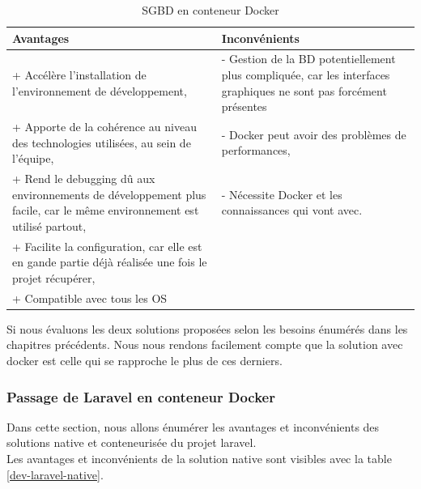 \documentclass[
    iai, %
    il, %
]{heig-tb}
\begin{document}
\begin{table}[h]
    \begin{center}
        \caption{SGBD en conteneur Docker \label{dev-sgbd-docker}}
        \begin{tabularx}{1.0\textwidth} {X|X}
            Avantages                             & Inconvénients                                                           \\ \hline
            + Accélère l'installation de l'environnement de développement,
            \cite{labrecque,data-flair-pros-cons} & - Gestion de la BD
            potentiellement plus compliquée, car les interfaces graphiques ne sont pas forcément présentes                  \\
            + Apporte de la cohérence au niveau des technologies utilisées, au sein de l'équipe,
            \cite{labrecque,data-flair-use-cases} & - Docker peut avoir des problèmes de performances,
            \cite{labrecque}                                                                                                \\
            + Rend le debugging dû aux environnements de développement plus facile, car le même environnement est utilisé partout,
            \cite{labrecque,koukia}               & - Nécessite Docker et les connaissances qui vont avec. \cite{labrecque} \\
            + Facilite la configuration, car elle est en gande partie déjà réalisée une fois le projet récupérer,
            \cite{data-flair-pros-cons}           &                                                                         \\
            + Compatible avec tous les OS         &                                                                         \\
        \end{tabularx}
    \end{center}
\end{table}

Si nous évaluons les deux solutions proposées selon les besoins énumérés dans les chapitres précédents.
Nous nous rendons facilement compte que la solution avec \Gls{docker} est celle qui se rapproche le plus de ces derniers.

\subsubsection{Passage de Laravel en conteneur Docker}
Dans cette section, nous allons énumérer les avantages et inconvénients des solutions native et conteneurisée du projet \Gls{laravel}. \\
Les avantages et inconvénients de la solution native sont visibles avec la table \ref{dev-laravel-native}.
\end{document}
